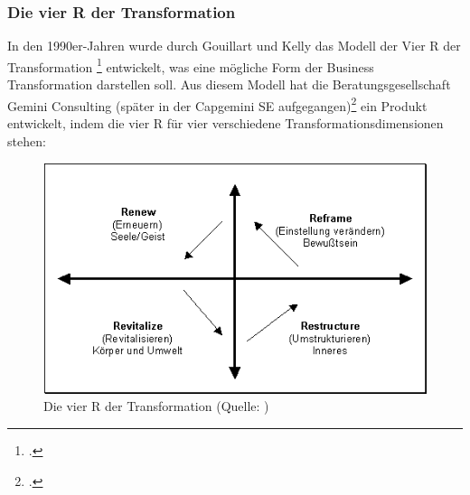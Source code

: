 \subsubsection{Die vier R der Transformation}
In den 1990er-Jahren wurde durch Gouillart und Kelly das Modell der \glqq{}Vier R der Transformation\grqq{} \footcite[Vgl.][]{4r-modell} entwickelt, was eine mögliche Form der Business Transformation darstellen soll. Aus diesem Modell hat die Beratungsgesellschaft Gemini Consulting (später in der Capgemini SE aufgegangen)\footcite[Vgl.][]{gemini-died} ein Produkt entwickelt, indem die vier R für vier verschiedene Transformationsdimensionen stehen:\\
\begin{figure}[h]
    \centering
    \includegraphics[scale=0.5]{Bilder/businesstransformationManagementportal.png}
    \caption[Die vier R der Transformation]{Die vier R der Transformation (Quelle: \cite[][]{4r-modell})}
\end{figure}

